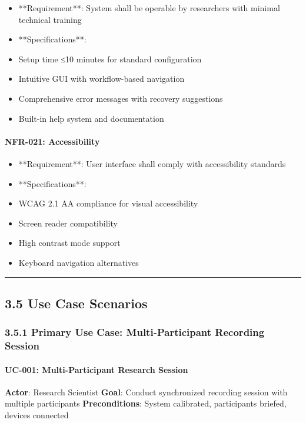 \documentclass[12pt,a4paper]{article}
\begin{document}
\begin{itemize}
\item **Requirement**: System shall be operable by researchers with minimal technical training
\item **Specifications**:
\item Setup time ≤10 minutes for standard configuration
\item Intuitive GUI with workflow-based navigation
\item Comprehensive error messages with recovery suggestions
\item Built-in help system and documentation

\end{itemize}
\paragraph{NFR-021: Accessibility}

\begin{itemize}
\item **Requirement**: User interface shall comply with accessibility standards
\item **Specifications**:
\item WCAG 2.1 AA compliance for visual accessibility
\item Screen reader compatibility
\item High contrast mode support
\item Keyboard navigation alternatives

\end{itemize}
\hrule

\subsection{3.5 Use Case Scenarios}

\subsubsection{3.5.1 Primary Use Case: Multi-Participant Recording Session}

\paragraph{UC-001: Multi-Participant Research Session}

\textbf{Actor}: Research Scientist  
\textbf{Goal}: Conduct synchronized recording session with multiple participants  
\textbf{Preconditions}: System calibrated, participants briefed, devices connected
\end{document}
